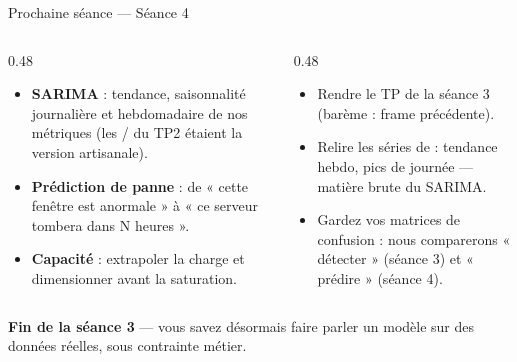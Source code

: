 \begin{frame}{Prochaine séance --- Séance 4}
\begin{columns}[t]
\begin{column}{0.48\textwidth}
\begin{kbox}
\begin{itemize}
\item \textbf{SARIMA} : tendance, saisonnalité journalière et
hebdomadaire de nos métriques (les / du
TP2 étaient la version artisanale).
\item \textbf{Prédiction de panne} : de « cette fenêtre est
anormale » à « ce serveur tombera dans N heures ».
\item \textbf{Capacité} : extrapoler la charge et dimensionner
avant la saturation.
\end{itemize}
\end{kbox}
\end{column}
\begin{column}{0.48\textwidth}
\begin{ebox}[À préparer]
\begin{itemize}
\item Rendre le TP de la séance 3 (barème : frame précédente).
\item Relire les séries de  :
tendance hebdo, pics de journée --- matière brute du SARIMA.
\item Gardez vos matrices de confusion : nous comparerons
« détecter » (séance 3) et « prédire » (séance 4).
\end{itemize}
\end{ebox}
\end{column}
\end{columns}
\vspace{2mm}
\begin{center}\small
\textbf{Fin de la séance 3} --- vous savez désormais faire
parler un modèle sur des données réelles, sous contrainte métier.
\end{center}
\end{frame}
